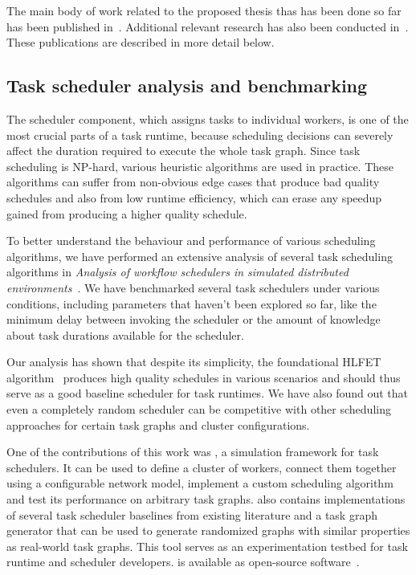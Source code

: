 The main body of work related to the proposed thesis thas has been done so far has been published
in~\cite{estee, rsds}. Additional relevant research has also been conducted
in~\cite{spin2,spin}. These publications are described in more detail below.

\subsection{Task scheduler analysis and benchmarking}
The scheduler component, which assigns tasks to individual workers, is one of the
most crucial parts of a task runtime, because scheduling decisions can severely affect the
duration required to execute the whole task graph. Since task scheduling is NP-hard, various
heuristic algorithms are used in practice. These algorithms can suffer from non-obvious edge cases
that produce bad quality schedules and also from low runtime efficiency, which can erase any
speedup gained from producing a higher quality schedule.

To better understand the behaviour and performance of various scheduling algorithms, we have
performed an extensive analysis of several task scheduling algorithms in
\emph{Analysis of workflow schedulers in simulated distributed environments}~\cite{estee}.
We have benchmarked several task schedulers under various conditions, including parameters that
haven't been explored so far, like the minimum delay between invoking the
scheduler or the amount of knowledge about task durations available for the scheduler.

Our analysis has shown that despite its simplicity, the foundational HLFET
algorithm~\cite{hlfet1974} produces high quality schedules in various scenarios and should thus
serve as a good baseline scheduler for task runtimes. We have also found out that even a
completely random scheduler can be competitive with other scheduling approaches for certain task
graphs and cluster configurations.


One of the contributions of this work was \estee{}, a simulation framework for task
schedulers. It can be used to define a cluster of workers, connect them together using a
configurable network model, implement a custom scheduling algorithm and test its performance on
arbitrary task graphs. \estee{} also contains implementations of several task scheduler
baselines from existing literature and a task graph generator that can be used to generate
randomized graphs with similar properties as real-world task graphs. This tool serves as an
experimentation testbed for task runtime and scheduler developers. \estee{} is
available as open-source software~.

